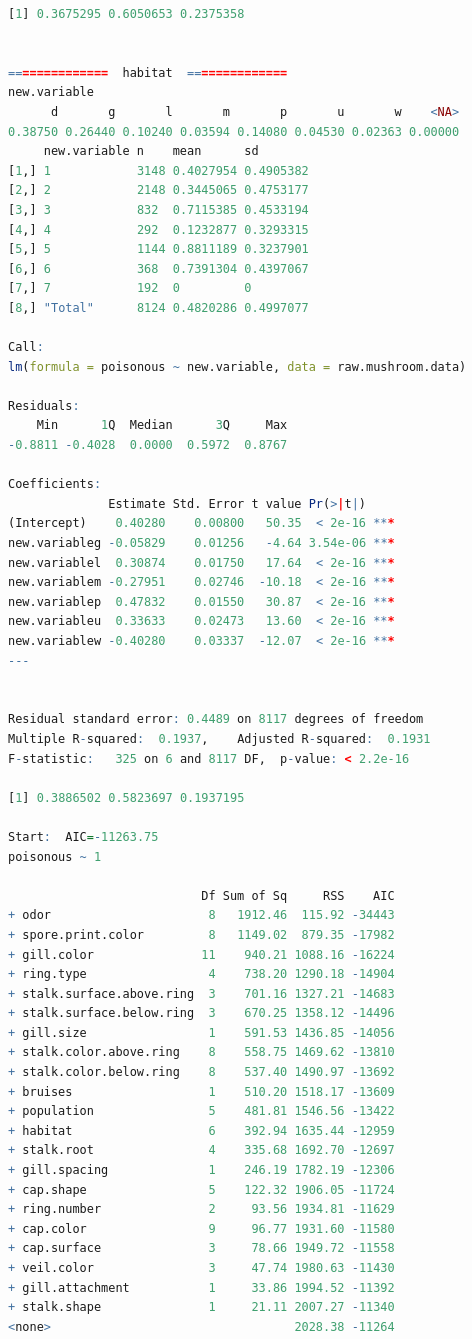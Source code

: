 \documentclass[12pt]{article}
\begin{document}
\begin{lstlisting}[language = R]
[1] 0.3675295 0.6050653 0.2375358


==============  habitat  ==============
new.variable
      d       g       l       m       p       u       w    <NA> 
0.38750 0.26440 0.10240 0.03594 0.14080 0.04530 0.02363 0.00000 
     new.variable n    mean      sd       
[1,] 1            3148 0.4027954 0.4905382
[2,] 2            2148 0.3445065 0.4753177
[3,] 3            832  0.7115385 0.4533194
[4,] 4            292  0.1232877 0.3293315
[5,] 5            1144 0.8811189 0.3237901
[6,] 6            368  0.7391304 0.4397067
[7,] 7            192  0         0        
[8,] "Total"      8124 0.4820286 0.4997077

Call:
lm(formula = poisonous ~ new.variable, data = raw.mushroom.data)

Residuals:
    Min      1Q  Median      3Q     Max 
-0.8811 -0.4028  0.0000  0.5972  0.8767 

Coefficients:
              Estimate Std. Error t value Pr(>|t|)    
(Intercept)    0.40280    0.00800   50.35  < 2e-16 ***
new.variableg -0.05829    0.01256   -4.64 3.54e-06 ***
new.variablel  0.30874    0.01750   17.64  < 2e-16 ***
new.variablem -0.27951    0.02746  -10.18  < 2e-16 ***
new.variablep  0.47832    0.01550   30.87  < 2e-16 ***
new.variableu  0.33633    0.02473   13.60  < 2e-16 ***
new.variablew -0.40280    0.03337  -12.07  < 2e-16 ***
---


Residual standard error: 0.4489 on 8117 degrees of freedom
Multiple R-squared:  0.1937,	Adjusted R-squared:  0.1931 
F-statistic:   325 on 6 and 8117 DF,  p-value: < 2.2e-16

[1] 0.3886502 0.5823697 0.1937195

Start:  AIC=-11263.75
poisonous ~ 1

                           Df Sum of Sq     RSS    AIC
+ odor                      8   1912.46  115.92 -34443
+ spore.print.color         8   1149.02  879.35 -17982
+ gill.color               11    940.21 1088.16 -16224
+ ring.type                 4    738.20 1290.18 -14904
+ stalk.surface.above.ring  3    701.16 1327.21 -14683
+ stalk.surface.below.ring  3    670.25 1358.12 -14496
+ gill.size                 1    591.53 1436.85 -14056
+ stalk.color.above.ring    8    558.75 1469.62 -13810
+ stalk.color.below.ring    8    537.40 1490.97 -13692
+ bruises                   1    510.20 1518.17 -13609
+ population                5    481.81 1546.56 -13422
+ habitat                   6    392.94 1635.44 -12959
+ stalk.root                4    335.68 1692.70 -12697
+ gill.spacing              1    246.19 1782.19 -12306
+ cap.shape                 5    122.32 1906.05 -11724
+ ring.number               2     93.56 1934.81 -11629
+ cap.color                 9     96.77 1931.60 -11580
+ cap.surface               3     78.66 1949.72 -11558
+ veil.color                3     47.74 1980.63 -11430
+ gill.attachment           1     33.86 1994.52 -11392
+ stalk.shape               1     21.11 2007.27 -11340
<none>                                  2028.38 -11264


\end{lstlisting}
\end{document}
